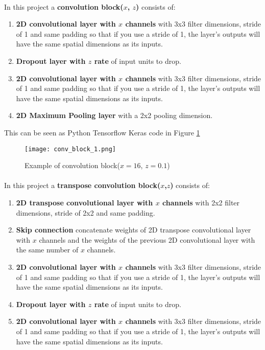 \paragraph{}
In this project a \textbf{convolution block($x$, $z$)} consists of:
    \begin{enumerate}
        \item \textbf{2D convolutional layer with $x$ channels} with 3x3 filter dimensions, stride of 1 and same padding so that if you use a stride of 1, the layer's outputs will have the same spatial dimensions as its inputs.
        \item \textbf{Dropout layer with $z$ rate} of input units to drop.
        \item \textbf{2D convolutional layer with $x$ channels} with 3x3 filter dimensions, stride of 1 and same padding so that if you use a stride of 1, the layer's outputs will have the same spatial dimensions as its inputs.
        \item \textbf{2D Maximum Pooling layer} with a 2x2 pooling dimension.
    \end{enumerate}
This can be seen as Python Tensorflow Keras code in Figure \ref{conv_block_1}
\begin{figure}[hbt!]
    \centering
    \texttt{[image: conv\_block\_1.png]}
    \caption{Example of convolution block($x=16$, $z=0.1$)}
    \label{conv_block_1}
\end{figure}

\paragraph{}
In this project a \textbf{transpose convolution block($x$,$z$)} consists of:
    \begin{enumerate}
        \item \textbf{2D transpose convolutional layer with $x$ channels} with 2x2 filter dimensions, stride of 2x2 and same padding.
        \item \textbf{Skip connection} concatenate weights of 2D transpose convolutional layer with $x$ channels and the weights of the previous 2D convolutional layer with the same number of $x$ channels.
        \item \textbf{2D convolutional layer with $x$ channels} with 3x3 filter dimensions, stride of 1 and same padding so that if you use a stride of 1, the layer's outputs will have the same spatial dimensions as its inputs.
        \item \textbf{Dropout layer with $z$ rate} of input units to drop.
        \item \textbf{2D convolutional layer with $x$ channels} with 3x3 filter dimensions, stride of 1 and same padding so that if you use a stride of 1, the layer's outputs will have the same spatial dimensions as its inputs.
    \end{enumerate}  

